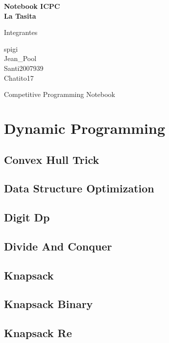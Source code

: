\documentclass[a4paper,10pt]{article}
\begin{document}
\begin{titlepage}\centering\vspace*{2cm}
{\Huge\bfseries Notebook ICPC\\[0.4cm]La Tasita\par}
\vspace{1cm}{\LARGE Team: UPC - Turistas\par}
\vfill{\Large Integrantes\par}\vspace{0.4cm}
spigi\\
Jean\_Pool\\
Santi2007939\\
Chatito17
\vfill{\large Competitive Programming Notebook\par}\end{titlepage}
\tableofcontents
\clearpage
\section{Dynamic Programming}
\subsection{Convex Hull Trick}

\subsection{Data Structure Optimization}

\subsection{Digit Dp}

\subsection{Divide And Conquer}

\subsection{Knapsack}

\subsection{Knapsack Binary}

\subsection{Knapsack Re}

\end{document}
